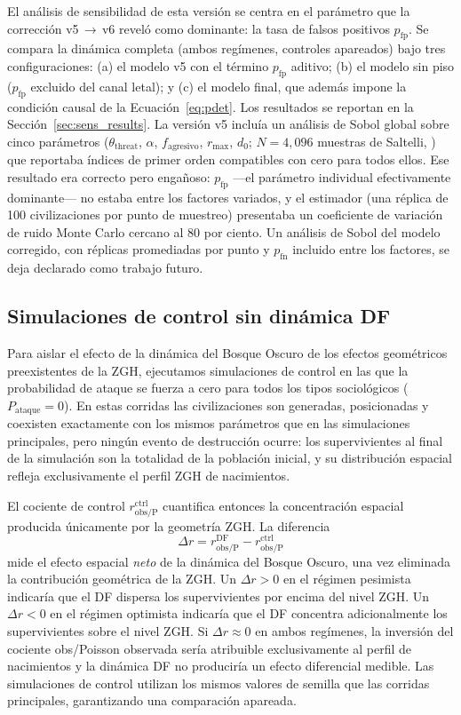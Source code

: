 \documentclass[useAMS,usenatbib,onecolumn]{mn2e}
\begin{document}
El análisis de sensibilidad de esta versión se centra en el parámetro
que la corrección v5\,$\to$\,v6 reveló como dominante: la tasa de
falsos positivos $p_\text{fp}$.
Se compara la dinámica completa (ambos regímenes, controles apareados)
bajo tres configuraciones: (a) el modelo v5 con el término
$p_\text{fp}$ aditivo; (b) el modelo sin piso ($p_\text{fp}$ excluido
del canal letal); y (c) el modelo final, que además impone la condición
causal de la Ecuación~\ref{eq:pdet}.
Los resultados se reportan en la Sección~\ref{sec:sens_results}.
La versión v5 incluía un análisis de Sobol global sobre cinco
parámetros ($\theta_\text{threat}$, $\alpha$, $f_\text{agresivo}$,
$r_\text{max}$, $d_0$; $N = 4{,}096$ muestras de Saltelli,
\citealt{saltelli2010}) que reportaba índices de primer orden
compatibles con cero para todos ellos.
Ese resultado era correcto pero engañoso: $p_\text{fp}$ —el parámetro
individual efectivamente dominante— no estaba entre los factores
variados, y el estimador (una réplica de 100 civilizaciones por punto
de muestreo) presentaba un coeficiente de variación de ruido Monte
Carlo cercano al 80 por ciento.
Un análisis de Sobol del modelo corregido, con réplicas promediadas
por punto y $p_\text{fn}$ incluido entre los factores, se deja
declarado como trabajo futuro.

\subsection{Simulaciones de control sin dinámica DF}
\label{sec:control}

Para aislar el efecto de la dinámica del Bosque Oscuro de los efectos
geométricos preexistentes de la ZGH, ejecutamos simulaciones de control
en las que la probabilidad de ataque se fuerza a cero para todos los
tipos sociológicos ($P_\text{ataque} = 0$).
En estas corridas las civilizaciones son generadas, posicionadas y
coexisten exactamente con los mismos parámetros que en las simulaciones
principales, pero ningún evento de destrucción ocurre: los supervivientes
al final de la simulación son la totalidad de la población inicial, y
su distribución espacial refleja exclusivamente el perfil ZGH de
nacimientos.

El cociente de control $r_\text{obs/P}^\text{ctrl}$ cuantifica entonces
la concentración espacial producida únicamente por la geometría ZGH.
La diferencia
\begin{equation}
  \Delta r = r_\text{obs/P}^\text{DF} - r_\text{obs/P}^\text{ctrl}
  \label{eq:delta_r}
\end{equation}
mide el efecto espacial \emph{neto} de la dinámica del Bosque Oscuro,
una vez eliminada la contribución geométrica de la ZGH.
Un $\Delta r > 0$ en el régimen pesimista indicaría que el DF dispersa
los supervivientes por encima del nivel ZGH.
Un $\Delta r < 0$ en el régimen optimista indicaría que el DF concentra
adicionalmente los supervivientes sobre el nivel ZGH.
Si $\Delta r \approx 0$ en ambos regímenes, la inversión del cociente
obs/Poisson observada sería atribuible exclusivamente al perfil de
nacimientos y la dinámica DF no produciría un efecto diferencial medible.
Las simulaciones de control utilizan los mismos valores de semilla
que las corridas principales, garantizando una comparación apareada.
\end{document}
